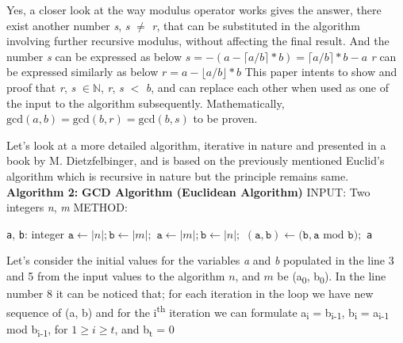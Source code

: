 \documentclass[conference,compsoc]{IEEEtran}
\newcommand{\N}{{\mathbb N}}
\newcommand{\var}[1]{\textit{#1}}
\newcommand{\progvar}[1]{\texttt{#1}}
\renewcommand{\mod}{\text{mod}}
\renewcommand{\gcd}{\text{gcd}}
\newcommand{\ceil}[1]{\lceil#1\rceil}
\newcommand{\floor}[1]{\lfloor#1\rfloor}
\begin{document}
Yes, a closer look at the way modulus operator works gives the answer, there exist another  number \var{s}, \var{s} $\neq$ \var{r}, that can be substituted in the algorithm involving further recursive modulus, without affecting the final result. And the number \textit{s} can be expressed as below
\newline $s = -(a-\ceil{a/b}*b) = \ceil{a/b}*b - a$
\newline \textit{r} can be expressed similarly as below
\newline $r = a - \floor{a/b}*b$
\newline This paper intents to show and proof that \textit{r}, \textit{s} $\in \N$, \textit{r}, \textit{s} $<$ \textit{b}, and can replace each other when used as one of the input to the algorithm subsequently. Mathematically, $\gcd(a,b) =\gcd(b,r) = \gcd(b,s)$ to be proven.


Let's look at a more detailed algorithm, iterative in nature and presented in a book by M. Dietzfelbinger, and is based on the previously mentioned Euclid's algorithm which is recursive in nature but the principle remains same.
\newline
\newline \textbf{Algorithm 2:}
\newline \textbf{GCD Algorithm (Euclidean Algorithm)}
\newline INPUT: Two integers \var{n}, \var{m}
\newline METHOD:


\begin{algorithmic}[1]
\STATE \progvar{a}, \progvar{b}: integer
	\STATE $\progvar{a} \gets |n|; \progvar{b} \gets |m|;$
\ELSE
	\STATE $\progvar{a} \gets |m|; \progvar{b} \gets |n|;$
\ENDIF
\WHILE{$\progvar{b} > 0$ } 
	\STATE $(\progvar{a}, \progvar{b}) \leftarrow (\progvar{b}, \progvar{a}  $ $\mod $ $\progvar{b});$
\ENDWHILE
\RETURN \progvar{a}
\end {algorithmic}

Let's consider the initial values for the variables \var{a} and \var{b} populated in the line 3 and 5 from the input values to the algorithm $n$, and $m$ be (a\textsubscript{0}, b\textsubscript{0}). In the line number 8 it can be noticed that; for each iteration in the loop we have new sequence of (a, b) and for the i\textsuperscript{th} iteration we can formulate a\textsubscript{i} = b\textsubscript{i-1}, b\textsubscript{i} = a\textsubscript{i-1} mod b\textsubscript{i-1}, for $1 \geq i \geq t$, and b\textsubscript{t} = 0
\end{document}

